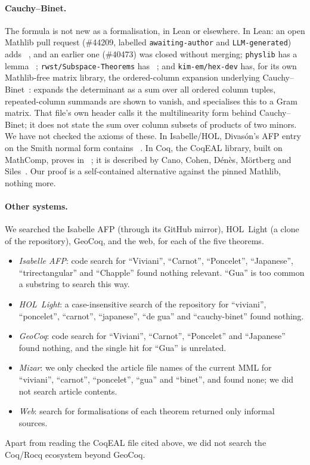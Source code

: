 \documentclass[11pt]{article}
\theoremstyle{definition}
\theoremstyle{remark}
\begin{document}
\paragraph{Cauchy--Binet.}
The formula is not new as a formalisation, in Lean or elsewhere. In Lean: an open Mathlib pull request
(\#44209, labelled \texttt{awaiting-author} and \texttt{LLM-generated}) adds
~\cite{PR44209}, and an earlier one (\#40473) was
closed without merging; \texttt{physlib} has a lemma ~\cite{Physlib};
\texttt{rwst/Subspace-Theorems} has ~\cite{Rwst}; and
\texttt{kim-em/hex-dev} has, for its own Mathlib-free matrix library, the ordered-column
expansion underlying Cauchy--Binet~\cite{HexDev}: 
expands the determinant as a sum over all ordered column tuples, repeated-column summands are shown
to vanish, and  specialises this to a Gram matrix. That
file's own header calls it the multilinearity form behind Cauchy--Binet; it does not state the
sum over column subsets of products of two minors. We have not checked the axioms of these. In
Isabelle/HOL, Divas\'on's AFP entry on the Smith normal form contains
~\cite{DivasonAFP}. In Coq, the CoqEAL library, built on MathComp, proves
 in ~\cite{CoqEAL}; it is described by Cano, Cohen,
D\'en\`es, M\"ortberg and Siles~\cite{CanoEtAl}. Our proof is a self-contained alternative against
the pinned Mathlib, nothing more.

\paragraph{Other systems.}
We searched the Isabelle AFP (through its GitHub mirror), HOL~Light (a clone of the repository),
GeoCoq, and the web, for each of the five theorems.
\begin{itemize}
\item \emph{Isabelle AFP}: code search for ``Viviani'', ``Carnot'', ``Poncelet'', ``Japanese'',
``trirectangular'' and ``Chapple'' found nothing relevant. ``Gua'' is too common a substring to
search this way.
\item \emph{HOL~Light}: a case-insensitive search of the repository for ``viviani'', ``poncelet'',
``carnot'', ``japanese'', ``de gua'' and ``cauchy-binet'' found nothing.
\item \emph{GeoCoq}: code search for ``Viviani'', ``Carnot'', ``Poncelet'' and ``Japanese'' found
nothing, and the single hit for ``Gua'' is unrelated.
\item \emph{Mizar}: we only checked the article file names of the current MML for ``viviani'',
``carnot'', ``poncelet'', ``gua'' and ``binet'', and found none; we did not search article contents.
\item \emph{Web}: search for formalisations of each theorem returned only informal sources.
\end{itemize}
Apart from reading the CoqEAL file cited above, we did not search the Coq/Rocq ecosystem beyond GeoCoq. %
\end{document}
